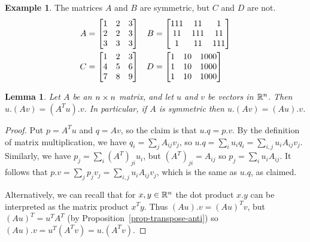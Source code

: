 \documentclass[reqno]{amsart}
\newtheorem{lemma}[theorem]{Lemma}
\theoremstyle{definition}
\newtheorem{example}[theorem]{Example}
\begin{document}
\begin{example}
 The matrices $A$ and $B$ are symmetric, but $C$ and $D$ are not.
 \begin{align*}
    A &
     = \left[\begin{matrix} 1 & 2 & 3 \\ 2 & 2 & 3 \\ 3 & 3 & 3 \end{matrix}\right] &
    B &
     = \left[\begin{matrix} 111 & 11 & 1 \\ 11 & 111 & 11 \\ 1 & 11 & 111 \end{matrix}\right]\\
    C &
     = \left[\begin{matrix} 1 & 2 & 3 \\ 4 & 5 & 6 \\ 7 & 8 & 9 \end{matrix}\right] &
    D &
     = \left[\begin{matrix} 1 & 10 & 1000 \\ 1 & 10 & 1000 \\ 1 & 10 & 1000 \end{matrix}\right]
 \end{align*}
\end{example}

\begin{lemma}\label{lem-transpose-adjoint}
 Let $A$ be an $n\times n$ matrix, and let $u$ and $v$ be vectors in
 ${\mathbb{R}}^n$.  Then $u.(Av)=(A^Tu).v$.  In particular, if $A$ is symmetric
 then $u.(Av)=(Au).v$.
\end{lemma}
\begin{proof}
 Put $p=A^Tu$ and $q=Av$, so the claim is that $u.q=p.v$.  By
 the definition of matrix multiplication, we have
 $q_i=\sum_jA_{ij}v_j$, so $u.q=\sum_iu_iq_i=\sum_{i,j}u_iA_{ij}v_j$.
 Similarly, we have $p_j=\sum_i(A^T)_{ji}u_i$, but $(A^T)_{ji}=A_{ij}$
 so $p_j=\sum_iu_iA_{ij}$.  It follows that
 $p.v=\sum_jp_jv_j=\sum_{i,j}u_iA_{ij}v_j$, which is the same as
 $u.q$, as claimed.

 Alternatively, we can recall that for $x,y\in{\mathbb{R}}^n$ the dot product
 $x.y$ can be interpreted as the matrix product $x^Ty$.  Thus
 $(Au).v=(Au)^Tv$, but $(Au)^T=u^TA^T$ (by
 Proposition~\ref{prop-transpose-anti}) so
 $(Au).v=u^T(A^Tv)=u.(A^Tv)$. 
\end{proof}
\end{document}
